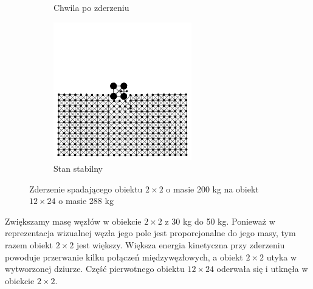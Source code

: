 \documentclass[12pt, letterpaper]{report}
\begin{document}
\begin{figure}[h]
\begin{subfigure}{0.5\textwidth}
            \caption{Chwila po zderzeniu}
        \end{subfigure}
        \begin{subfigure}{0.5\textwidth}
            \centering
            \includegraphics[width=6cm, height=6cm]{collision_2x2_24x12_mass50_4}
            \caption{Stan stabilny}
        \end{subfigure}
        
        \caption{Zderzenie spadającego obiektu $2 \times 2$ o masie 200 kg na obiekt $12 \times 24$ o masie 288 kg}
    \end{figure}

    Zwiększamy masę węzłów w obiekcie $2 \times 2$ z 30 kg do 50 kg. Ponieważ w reprezentacja wizualnej węzła jego pole 
    jest proporcjonalne do jego masy, tym razem obiekt $2 \times 2$ jest większy.
    Większa energia kinetyczna przy zderzeniu powoduje przerwanie kilku połączeń międzywęzłowych, a obiekt $2 \times 2$ 
    utyka w wytworzonej dziurze. Część pierwotnego obiektu $12 \times 24$ oderwała się i utknęła w obiekcie $2 \times 2$.

    \newpage
\end{document}
